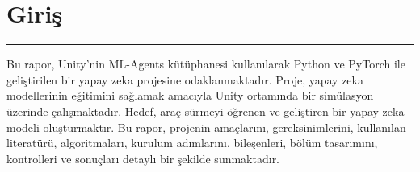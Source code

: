 \documentclass{article}
\begin{document}

\newpage

\section{Giriş}
\rule{\textwidth}{0.5pt}
\par Bu rapor, Unity'nin ML-Agents kütüphanesi kullanılarak Python ve PyTorch ile geliştirilen bir yapay zeka projesine odaklanmaktadır. Proje, yapay zeka modellerinin eğitimini sağlamak amacıyla Unity ortamında bir simülasyon üzerinde çalışmaktadır. Hedef, araç sürmeyi öğrenen ve geliştiren bir yapay zeka modeli oluşturmaktır. Bu rapor, projenin amaçlarını, gereksinimlerini, kullanılan literatürü, algoritmaları, kurulum adımlarını, bileşenleri, bölüm tasarımını, kontrolleri ve sonuçları detaylı bir şekilde sunmaktadır.
\end{document}
